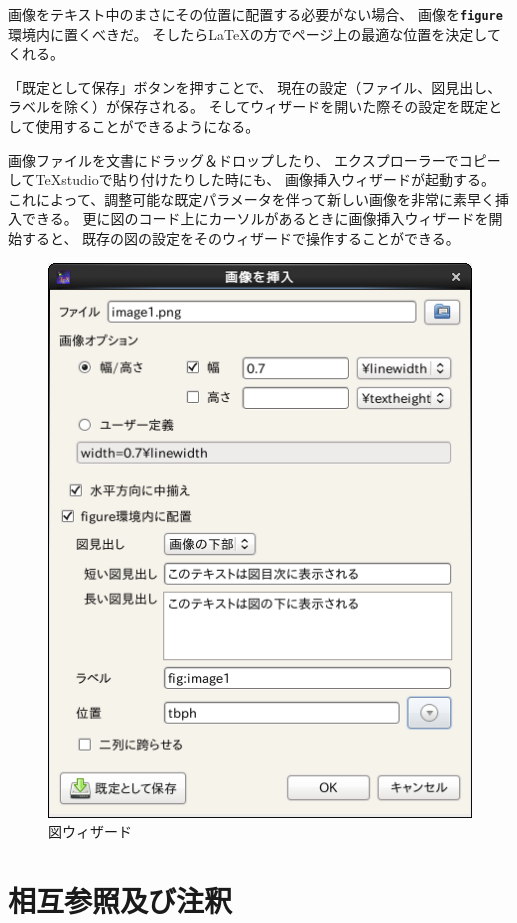画像をテキスト中のまさにその位置に配置する必要がない場合、
画像を\textbf{\texttt{figure}}環境内に置くべきだ。
そしたらLaTeXの方でページ上の最適な位置を決定してくれる。

「既定として保存」ボタンを押すことで、
現在の設定（ファイル、図見出し、ラベルを除く）が保存される。
そしてウィザードを開いた際その設定を既定として使用することができるようになる。

画像ファイルを文書にドラッグ＆ドロップしたり、
エクスプローラーでコピーしてTeXstudioで貼り付けたりした時にも、
画像挿入ウィザードが起動する。
これによって、調整可能な既定パラメータを伴って新しい画像を非常に素早く挿入できる。
更に図のコード上にカーソルがあるときに画像挿入ウィザードを開始すると、
既存の図の設定をそのウィザードで操作することができる。

\begin{figure}[H]
  \centering
  \includegraphics{wizard_figure.png}
  \caption{図ウィザード}
\end{figure}

\section{相互参照及び注釈}

